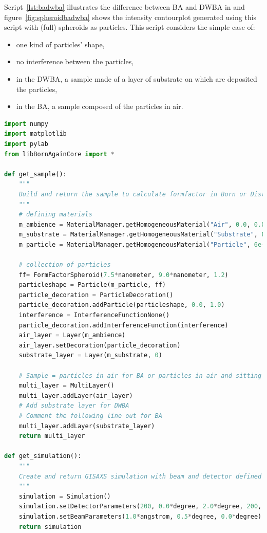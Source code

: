 Script~\ref{lst:badwba} illustrates the difference between BA and DWBA in \BornAgain and figure~\ref{fig:spheroidbadwba} shows the intensity contourplot generated using this script with (full) spheroids as particles. This script considers the simple case of:
\begin{itemize}
\item one kind of particles' shape,
\item no interference between the particles,
\item in the DWBA, a sample made of a layer of substrate on which are deposited the particles,
\item in the BA, a sample composed of the particles in air.
\end{itemize} 


\begin{lstlisting}[language=python, style=eclipseboxed,numbers=none,nolol,caption={\Code{Python} script to generate figure~\ref{fig:spheroidbadwba}. The difference between BA and DWBA in this simple case is the absence or presence of a substrate layer in the sample.},label={lst:badwba}]
import numpy
import matplotlib
import pylab
from libBornAgainCore import *

def get_sample():
    """
    Build and return the sample to calculate formfactor in Born or Distorted Wave Born Approximation.
    """
    # defining materials
    m_ambience = MaterialManager.getHomogeneousMaterial("Air", 0.0, 0.0)
    m_substrate = MaterialManager.getHomogeneousMaterial("Substrate", 6e-6, 2e-8)
    m_particle = MaterialManager.getHomogeneousMaterial("Particle", 6e-4, 2e-8)

    # collection of particles
    ff= FormFactorSpheroid(7.5*nanometer, 9.0*nanometer, 1.2)
    particleshape = Particle(m_particle, ff)
    particle_decoration = ParticleDecoration()
    particle_decoration.addParticle(particleshape, 0.0, 1.0)
    interference = InterferenceFunctionNone()
    particle_decoration.addInterferenceFunction(interference)
    air_layer = Layer(m_ambience)
    air_layer.setDecoration(particle_decoration)
    substrate_layer = Layer(m_substrate, 0)

    # Sample = particles in air for BA or particles in air and sitting on a substrate for DWBA
    multi_layer = MultiLayer()
    multi_layer.addLayer(air_layer)
    # Add substrate layer for DWBA 
    # Comment the following line out for BA
    multi_layer.addLayer(substrate_layer)
    return multi_layer

def get_simulation():
    """
    Create and return GISAXS simulation with beam and detector defined
    """
    simulation = Simulation()
    simulation.setDetectorParameters(200, 0.0*degree, 2.0*degree, 200, 0.0*degree, 2.0*degree, True)
    simulation.setBeamParameters(1.0*angstrom, 0.5*degree, 0.0*degree)
    return simulation


\end{lstlisting}
